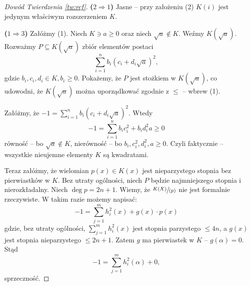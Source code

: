 \documentclass{article}
\theoremstyle{plain}
\theoremstyle{definition}
\theoremstyle{remark}
\begin{document}
\begin{proof}[Dowód Twierdzenia \ref{tw:rcf}]

	\textbf{($2 \Rightarrow 1$)}
	Jasne -- przy założeniu (2) $K(i)$ jest jedynym właściwym rozszerzeniem
	$K$.

	\textbf{($1 \Rightarrow 3$)}
	Załóżmy (1). Niech $K \ni a \geq 0$ oraz niech
	$\sqrt{a} \notin K$. Weźmy $K(\sqrt{a})$. Rozważmy $P \subseteq
	K(\sqrt{a})$ zbiór elementów postaci
	\[
		\sum_{i=1}^{n} b_i (c_i + d_i \sqrt{a})^2,
	\]
	gdzie $b_i, c_i, d_i \in K, b_i \geq 0$. Pokażemy, że $P$ jest stożkiem
	w $K(\sqrt{a})$, co udowodni, że $K(\sqrt{a})$ można uporządkować
	zgodnie z $\leq$ -- wbrew (1).

	Załóżmy, że $-1 = \sum_{i=1}^n b_i (c_i + d_i \sqrt{a})^2$.%
	Wtedy
	$$ -1 = \sum_{i=1}^n b_i c_i^2 + b_i d_i^2 a \geq 0$$
	równość -- bo $\sqrt{a} \notin K$,
	nierówność -- bo $b_i, c_i^2, d_i^2, a \geq 0$.
	Czyli faktycznie -- wszystkie nieujemne elementy $K$ są kwadratami.

	Teraz załóżmy, że wielomian $p(x) \in K(x)$ jest nieparzystego stopnia
	bez pierwiastków w $K$. Bez utraty ogólności, niech $P$ będzie
	najmniejszego stopnia i nierozkładalny. %
	Niech $\deg p = 2n + 1$. Wiemy, że $\sfrac{K(X)}{(p)}$ nie jest
	formalnie rzeczywiste. W takim razie możemy napisać: %
	\[
		- 1 = \sum_{j=1}^m h_i^2(x) + g(x) \cdot p(x)
	\]
	gdzie, bez utraty ogólności, $\sum_{j=1}^m h_i^2(x)$ jest stopnia
	parzystego $\leq 4n$, a $g(x)$ jest stopnia nieparzystego $\leq 2n + 1$.
	Zatem $g$ ma pierwiastek w $K$ -- $g(\alpha) = 0$. Stąd
	\[
		- 1 = \sum_{j=1}^m h_i^2(\alpha) + 0,
	\]
	sprzeczność.


\end{proof}
\end{document}

